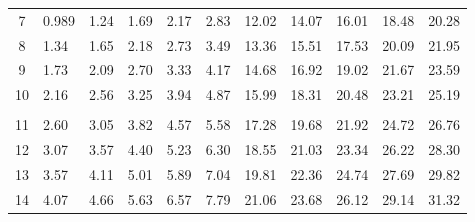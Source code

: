 \begin{table}[H]
{\begin{tabular}{ c | l l l l l l l l l l}
            7                    & 0.989                  & 1.24               & 1.69                   & 2.17                 & 2.83                  & 12.02                 & 14.07                 & 16.01                   & 18.48                 & 20.28                   \\
            8                    & 1.34                   & 1.65               & 2.18                   & 2.73                 & 3.49                  & 13.36                 & 15.51                 & 17.53                   & 20.09                 & 21.95                   \\
            9                    & 1.73                   & 2.09               & 2.70                   & 3.33                 & 4.17                  & 14.68                 & 16.92                 & 19.02                   & 21.67                 & 23.59                   \\
            10                   & 2.16                   & 2.56               & 3.25                   & 3.94                 & 4.87                  & 15.99                 & 18.31                 & 20.48                   & 23.21                 & 25.19                   \\
                                 &                        &                    &                        &                      &                       &                       &                       &                         &                       &                         \\
            11                   & 2.60                   & 3.05               & 3.82                   & 4.57                 & 5.58                  & 17.28                 & 19.68                 & 21.92                   & 24.72                 & 26.76                   \\
            12                   & 3.07                   & 3.57               & 4.40                   & 5.23                 & 6.30                  & 18.55                 & 21.03                 & 23.34                   & 26.22                 & 28.30                   \\
            13                   & 3.57                   & 4.11               & 5.01                   & 5.89                 & 7.04                  & 19.81                 & 22.36                 & 24.74                   & 27.69                 & 29.82                   \\
            14                   & 4.07                   & 4.66               & 5.63                   & 6.57                 & 7.79                  & 21.06                 & 23.68                 & 26.12                   & 29.14                 & 31.32                   \\

\end{tabular}}
\end{table}
